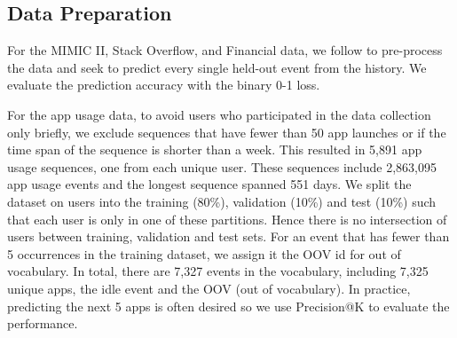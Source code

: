 \documentclass{article} %
\begin{document}
\begin{itemize}

\end{itemize}

\subsection{Data Preparation}
For the MIMIC II, Stack Overflow, and Financial data, we follow \citep{DuDaiTri16} to pre-process the data and seek to predict every single held-out event from the history. We evaluate the prediction accuracy with the binary 0-1 loss. 

For the app usage data, to avoid users who participated in the data collection only briefly, we exclude sequences that have fewer than 50 app launches or if the time span of the sequence is shorter than a week. This resulted in 5,891 app usage sequences, one from each unique user. These sequences include 2,863,095 app usage events and the longest sequence spanned 551 days. We split the dataset on users into the training (80\%), validation (10\%) and test (10\%) such that each user is only in one of these partitions. Hence there is no intersection of users between training, validation and test sets. For
an event that has fewer than 5 occurrences in the training dataset, we assign it the OOV id for out of vocabulary. In total, there are 7,327 events in the vocabulary, including 7,325 unique apps, the idle event and the OOV (out of vocabulary). In practice, predicting the next 5 apps is often desired so we use Precision@K to evaluate the performance. 
\end{document}
